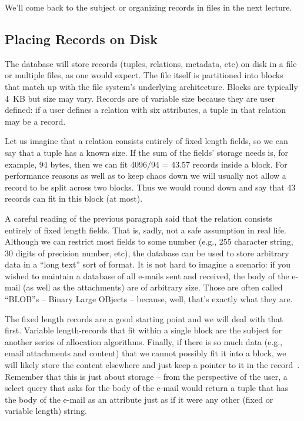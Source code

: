 We'll come back to the subject or organizing records in files in the next lecture.

\subsection*{Placing Records on Disk}

The database will store records (tuples, relations, metadata, etc) on disk in a file or multiple files, as one would expect. The file itself is partitioned into blocks that match up with the file system's underlying architecture. Blocks are typically 4~KB but size may vary. Records are of variable size because they are user defined: if a user defines a relation with six attributes, a tuple in that relation may be a record.

Let us imagine that a relation consists entirely of fixed length fields, so we can say that a tuple has a known size. If the sum of the fields' storage needs is, for example, 94 bytes, then we can fit 4096/94 = 43.57 records inside a block. For performance reasons as well as to keep chaos down we will usually not allow a record to be split across two blocks. Thus we would round down and say that 43 records can fit in this block (at most).

A careful reading of the previous paragraph said that the relation consists entirely of fixed length fields. That is, sadly, not a safe assumption in real life. Although we can restrict most fields to some number (e.g., 255 character string, 30 digits of precision number, etc), the database can be used to store arbitrary data in a ``long text'' sort of format. It is not hard to imagine a scenario: if you wished to maintain a database of all e-mails sent and received, the body of the e-mail (as well as the attachments) are of arbitrary size. Those are often called ``BLOB''s -- Binary Large OBjects -- because, well, that's exactly what they are. 

The fixed length records are a good starting point and we will deal with that first. Variable length-records that fit within a single block are the subject for another series of allocation algorithms. Finally, if there is so much data (e.g., email attachments and content) that we cannot possibly fit it into a block, we will likely store the content elsewhere and just keep a pointer to it in the record~\cite{dsc}. Remember that this is just about storage -- from the perspective of the user, a select query that asks for the body of the e-mail would return a tuple that has the body of the e-mail as an attribute just as if it were any other (fixed or variable length) string.

